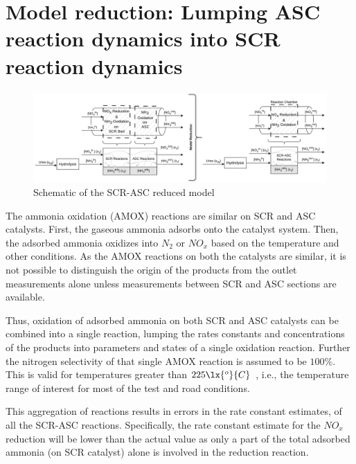 \section{Model reduction: Lumping ASC reaction dynamics into SCR reaction dynamics}

\begin{figure}[H]
    \centering
    \includegraphics[width=\textwidth]{Part3/figs/SCR-ASC_ModelReduction_horizontal.png}
    \caption{Schematic of the SCR-ASC reduced model}
    \label{fig:scr-asc}
\end{figure}

The ammonia oxidation (AMOX) reactions are similar on SCR and ASC catalysts. First, the gaseous ammonia adsorbs onto the
catalyst system. Then, the adsorbed ammonia oxidizes into $N_2$ or $NO_x$ based on the temperature and other conditions.
As the AMOX reactions on both the catalysts are similar, it is not possible to distinguish the origin of the products
from the outlet measurements alone unless measurements between SCR and ASC sections are available.

Thus, oxidation of adsorbed ammonia on both SCR and ASC catalysts can be  combined into a single reaction, lumping the
rates constants and concentrations of the products into parameters and states of a single oxidation reaction. Further
the nitrogen selectivity of that single AMOX reaction is assumed to be $100\%$. This is valid for temperatures greater
than $225 \lx{^o}{C}$ \cite{jain2023diagnostics}, i.e., the temperature range of interest for most of the test and road
conditions.

This aggregation of reactions results in errors in the rate constant estimates, of all the SCR-ASC reactions.
Specifically, the rate constant estimate for the $NO_x$ reduction will be lower than the actual value as only a part of
the total adsorbed ammonia (on SCR catalyst) alone is involved in the reduction reaction.
